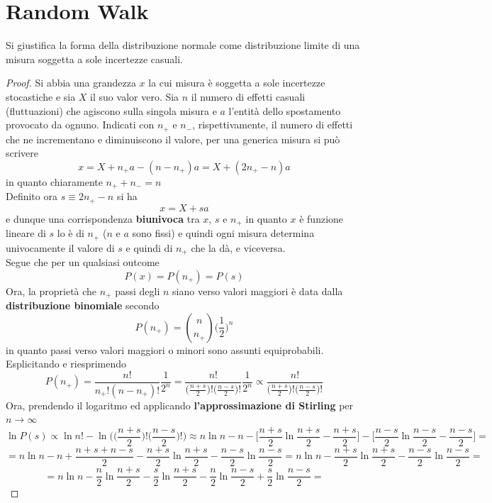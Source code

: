 \documentclass[10pt, oneside]{book}
\begin{document}
\section{Random Walk}
Si giustifica la forma della distribuzione normale come distribuzione limite di una misura soggetta a sole incertezze casuali.\\
\begin{proof}
Si abbia una grandezza $x$ la cui misura è soggetta a sole incertezze stocastiche e sia $X$ il suo valor vero. Sia $n$ il numero di effetti casuali (fluttuazioni) che agiscono sulla singola misura e $a$ l'entità dello spostamento provocato da ognuno. Indicati con $n_+$ e $n_-$, rispettivamente, il numero di effetti che ne incrementano e diminuiscono il valore, per una generica misura si può scrivere
\[x = X + n_+ a - (n- n_+) a = X + (2 n_+ - n) a\]
in quanto chiaramente $n_+ + n_- = n$\\Definito ora $\displaystyle s \equiv 2 n_+ - n$ si ha
\[x = X + sa\]
e dunque una corrispondenza \textbf{biunivoca} tra $x$, $s$ e $n_+$ in quanto $x$ è funzione lineare di $s$ lo è di $n_+$ ($n$ e $a$ sono fissi) e quindi ogni misura determina univocamente il valore di $s$ e quindi di $n_+$ che la dà, e viceversa.\\
Segue che per un qualsiasi outcome
\[P(x) = P(n_+) = P(s)\]
Ora, la proprietà che $n_+$ passi degli $n$ siano verso valori maggiori è data dalla \textbf{distribuzione binomiale} secondo
\[P(n_+) = \binom{n}{n_+} \bigg(\frac{1}{2}\bigg)^{n}\]
in quanto passi verso valori maggiori o minori sono assunti equiprobabili.\\
Esplicitando e riesprimendo
\[P(n_+) = \frac{n!}{n_+! (n-n_+)!} \frac{1}{2^n} = \frac{n!}{\displaystyle \bigg(\frac{n+s}{2}\bigg)!\bigg(\frac{n-s}{2}\bigg)!} \frac{1}{2^n} \propto \frac{n!}{\displaystyle \bigg(\frac{n+s}{2}\bigg)!\bigg(\frac{n-s}{2}\bigg)!}\]
Ora, prendendo il logaritmo ed applicando \textbf{l'approssimazione di Stirling} per $n \rightarrow \infty$
\[\ln P(s) \propto \ln n! - \ln \bigg(\displaystyle \bigg(\frac{n+s}{2}\bigg)!\bigg(\frac{n-s}{2}\bigg)!\bigg) \approx n \ln n - n - \bigg[\frac{n+s}{2} \ln \frac{n+s}{2}  - \frac{n+s}{2} \bigg] - \bigg[\frac{n-s}{2} \ln \frac{n-s}{2}   - \frac{n-s}{2} \bigg] =\]
\[= n \ln n - n + \frac{n+s + n - s}{2} - \frac{n+s}{2} \ln \frac{n+s}{2} - \frac{n-s}{2} \ln \frac{n-s}{2} = n \ln n - \frac{n+s}{2} \ln \frac{n+s}{2} - \frac{n-s}{2} \ln \frac{n-s}{2} =\]
\[ = n \ln n - \frac{n}{2} \ln \frac{n+s}{2} - \frac{s}{2} \ln \frac{n+s}{2} - \frac{n}{2} \ln \frac{n-s}{2} + \frac{s}{2} \ln \frac{n-s}{2} =\]

\end{proof}
\end{document}
